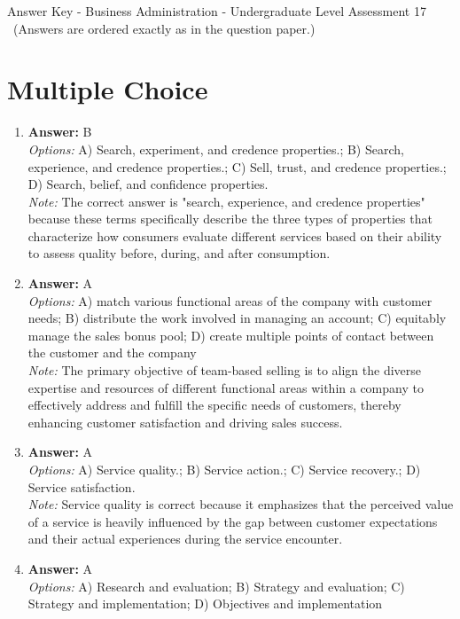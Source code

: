 \documentclass[12pt]{article}
\begin{document}
\begin{center}
Answer Key - Business Administration - Undergraduate Level Assessment 17 \
\small (Answers are ordered exactly as in the question paper.)
\end{center}

\section*{Multiple Choice}
\begin{enumerate}[label=\arabic*.]
\item \textbf{Answer:} B
\\ \textit{Options:} A) Search, experiment, and credence properties.; B) Search, experience, and credence properties.; C) Sell, trust, and credence properties.; D) Search, belief, and confidence properties.
\\ \textit{Note:} The correct answer is "search, experience, and credence properties" because these terms specifically describe the three types of properties that characterize how consumers evaluate different services based on their ability to assess quality before, during, and after consumption.
\item \textbf{Answer:} A
\\ \textit{Options:} A) match various functional areas of the company with customer needs; B) distribute the work involved in managing an account; C) equitably manage the sales bonus pool; D) create multiple points of contact between the customer and the company
\\ \textit{Note:} The primary objective of team-based selling is to align the diverse expertise and resources of different functional areas within a company to effectively address and fulfill the specific needs of customers, thereby enhancing customer satisfaction and driving sales success.
\item \textbf{Answer:} A
\\ \textit{Options:} A) Service quality.; B) Service action.; C) Service recovery.; D) Service satisfaction.
\\ \textit{Note:} Service quality is correct because it emphasizes that the perceived value of a service is heavily influenced by the gap between customer expectations and their actual experiences during the service encounter.
\item \textbf{Answer:} A
\\ \textit{Options:} A) Research and evaluation; B) Strategy and evaluation; C) Strategy and implementation; D) Objectives and implementation

\end{enumerate}
\end{document}
